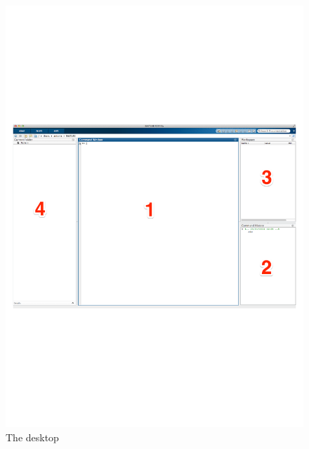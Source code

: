 \begin{figure}
	\myfloatalign
	\includegraphics[width=\linewidth]{Graphics/Unit01/matlab_desktop}
	\caption{The \mlab desktop}
	\label{fig:matlab_desktop}
\end{figure}

